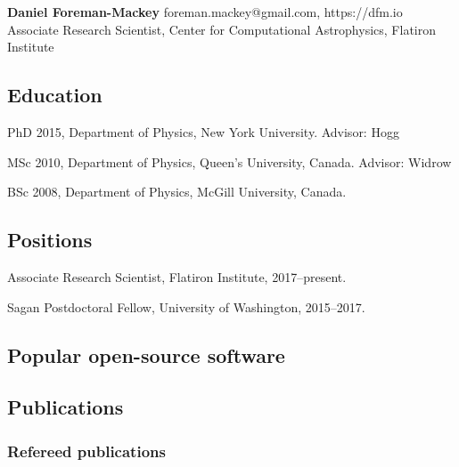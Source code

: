\documentclass[12pt,letterpaper]{article}
\begin{document}
\thispagestyle{empty}\sloppy\sloppypar\raggedbottom

\textbf{\Large Daniel Foreman-Mackey} \hfill
\textsf{\small foreman.mackey@gmail.com, https://dfm.io} \\[0.5ex]
Associate Research Scientist, Center for Computational Astrophysics, Flatiron Institute\\[0.5ex]

\subsection{Education}
\begin{list}{}{\cvlist}
  \item
        PhD 2015, Department of Physics, New York University. Advisor: Hogg
  \item
        MSc 2010, Department of Physics, Queen's University, Canada. Advisor: Widrow
  \item
        BSc 2008, Department of Physics, McGill University, Canada.
\end{list}

\subsection{Positions}
\begin{list}{}{\cvlist}
  \item
        Associate Research Scientist, Flatiron Institute, 2017--present.
  \item
        Sagan Postdoctoral Fellow, University of Washington, 2015--2017.
\end{list}

\subsection{Popular open-source software}
\begin{list}{}{\cvlist}
  
\end{list}

  \subsection{Publications}
  

  \subsubsection{Refereed publications}
  \begin{list}{}{\cvlist}
    
  \end{list}
\end{document}
